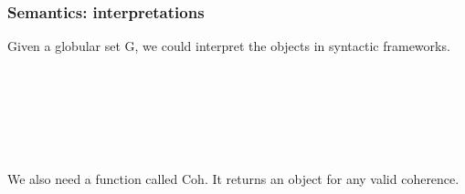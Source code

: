 \documentclass[12pt, mathserif,handout]{beamer}
\begin{document}
\begin{frame}

\frametitle{Semantics: interpretations}

Given a globular set G, we could interpret the objects in syntactic frameworks. 

\begin{code}\>\<%
\\
\> \AgdaSymbol{:}   \<%
\\
\> \AgdaSymbol{:}   \AgdaSymbol{:} \AgdaSymbol{\}}  \AgdaSymbol{(}  \AgdaSymbol{)}        \<%
\\
\> \AgdaSymbol{:} \AgdaSymbol{\}(} \AgdaSymbol{:}  \AgdaSymbol{)(} \AgdaSymbol{:}   \AgdaSymbol{)}  \<%
\\
\> \AgdaSymbol{:}  \AgdaSymbol{\}(} \AgdaSymbol{:}  \AgdaSymbol{)(} \AgdaSymbol{:} \<[30]%
\>[30]  \AgdaSymbol{)}        \<[53]%
\>[53]\<%
\\
\>\<\end{code}

We also need a function called Coh.
It returns an object for any valid coherence.
\footnotesize
\begin{code}\>\<%
\\
\> \AgdaSymbol{:} \AgdaSymbol{(} \AgdaSymbol{:} \AgdaSymbol{)(} \AgdaSymbol{:}  \AgdaSymbol{)(} \AgdaSymbol{:}  \AgdaSymbol{)}  \AgdaSymbol{(} \AgdaSymbol{:}   \AgdaSymbol{)}       \<%
\\
\>\<\end{code}

\end{frame}
\end{document}

